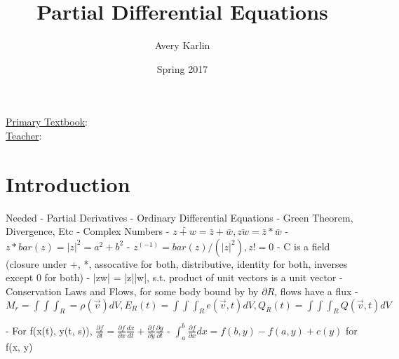 \documentclass[11 pt, twoside]{article}
\begin{document}
\title{Partial Differential Equations}
\author{Avery Karlin}
\date{Spring 2017}
\newcommand{\textbook}{}
\newcommand{\teacher}{}

\maketitle
\newpage
\hypertarget{content}{\tableofcontents}
\vspace{11pt}
\noindent
\underline{Primary Textbook}: \textbook\\
\underline{Teacher}: \teacher
\newpage

\section{Introduction} {
Needed - Partial Derivatives
   - Ordinary Differential Equations
   - Green Theorem, Divergence, Etc
   - Complex Numbers - $\bar{z + w} = \bar{z} + \bar{w}, \bar{zw} = \bar{z} * \bar{w}$
   					 - $z*bar(z) = |z|^2 = a^2 + b^2$
   					 - $z^(-1) = bar(z)/(|z|^2), z != 0$
   					 - C is a field (closure under +, *, assocative for both, distributive, identity for both, inverses except 0 for both)
   					 - |zw| = |z||w|, s.t. product of unit vectors is a unit vector
- Conservation Laws and Flows, for some body bound by by $\partial R$, flows have a flux
	- $M_r = \int \int \int_R = \rho(\vec{v})dV, E_R(t) = \int \int \int_R  e(\vec{v}, t) dV, Q_R(t) = \int \int \int_R Q(\vec{v}, t)dV$

- For f(x(t), y(t, s)), $\frac{\partial f}{\partial t} = \frac{\partial f}{\partial x}\frac{dx}{dt} + \frac{\partial f}{\partial y}\frac{\partial y}{\partial t}$
	- $\int^b_a \frac{\partial f}{\partial x}dx = f(b, y) - f(a, y) + c(y)$ for f(x, y)
}
\end{document}
